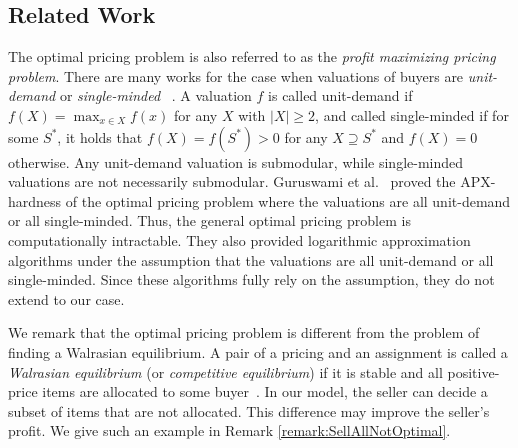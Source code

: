 \documentclass[letterpaper]{article}
\theoremstyle{definition}
\newcommand{\COMM}[2]{{
\begin{CJK}{UTF8}{ipxm}
\ifthenelse{\equal{#1}{TM}}{\color{blue}}{
\ifthenelse{\equal{#1}{YK}}{\color{red}}{
\ifthenelse{\equal{#1}{HS}}{\color{cyan}}{
\ifthenelse{\equal{#1}{KK}}{\color{magenta}}}}}
[#1: #2]
\end{CJK}
}}
\begin{document}
\subsection{Related Work}
\label{sec:relatedwork}

The optimal pricing problem is also referred to as the \emph{profit maximizing pricing problem}.
There are many works for the case when valuations of buyers are \emph{unit-demand} or \emph{single-minded}~
\cite{aggarwal2004algorithms,goldberg2003envy,goldberg2001competitive,guruswami2005profit,cheung2008approximation,anshelevich2015envy}.
A valuation $f$ is called unit-demand if $f(X)=\max_{x \in X} f(x)$ for any $X$ with $|X| \geq 2$, and called single-minded if for some $S^*$, it holds that $f(X)=f(S^*) > 0$ for any $X \supseteq S^*$ and $f(X)=0$ otherwise.
Any unit-demand valuation is submodular, while single-minded valuations are not necessarily submodular.
Guruswami et al.~ proved the APX-hardness of the optimal pricing problem where the valuations are all unit-demand or all single-minded.
Thus, the general optimal pricing problem is computationally intractable.
They also provided logarithmic approximation algorithms under the assumption that the valuations are all unit-demand or all single-minded.
Since these algorithms fully rely on the assumption, they do not extend to our case.

We remark that the optimal pricing problem is different from the problem of finding a Walrasian equilibrium.
A pair of a pricing and an assignment is called a \emph{Walrasian equilibrium} (or \emph{competitive equilibrium}) if it is stable and all positive-price items are allocated to some buyer~\cite{nisan2007algorithmic11}.
In our model, the seller can decide a subset of items that are not allocated.
This difference may improve the seller's profit.
We give such an example in Remark \ref{remark:SellAllNotOptimal}.
\end{document}
